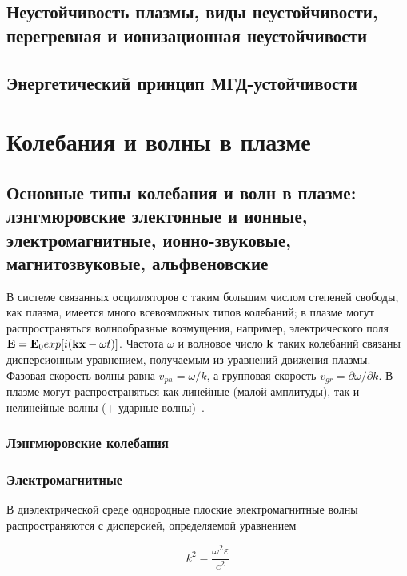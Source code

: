 \documentclass[10pt, a4paper]{article}
\let\stdsection\section
\renewcommand\section{\newpage\stdsection}
\begin{document}
\subsection{Неустойчивость плазмы, виды неустойчивости, перегревная и ионизационная неустойчивости}

\subsection{Энергетический принцип МГД-устойчивости}

\section{Колебания и волны в плазме}

\subsection{Основные типы колебания и волн в плазме: лэнгмюровские электонные и ионные, электромагнитные, ионно-звуковые, магнитозвуковые, альфвеновские}

В системе связанных осцилляторов с таким большим числом степеней свободы, как плазма, имеется много всевозможных типов колебаний; в плазме могут распространяться волнообразные возмущения, например, электрического поля $\vb{E}=\vb{E}_0exp[i(\vb{k}\vb{x}-\omega t)]$. Частота $\omega$ и волновое число $\vb{k}$ таких колебаний связаны дисперсионным уравнением, получаемым из уравнений движения плазмы. Фазовая скорость волны равна $v_{ph}=\omega/k$, а групповая скорость $v_{gr}=\partial\omega/\partial k$. В плазме могут распространяться как линейные (малой амплитуды), так и нелинейные волны (+ ударные волны)~\cite{kroll}.

\subsubsection{Лэнгмюровские колебания}



\subsubsection{Электромагнитные}

В диэлектрической среде однородные плоские электромагнитные волны распространяются с дисперсией, определяемой уравнением 

\begin{equation*}
	k^2=\frac{\omega^2\varepsilon}{c^2}
\end{equation*}
\end{document}
